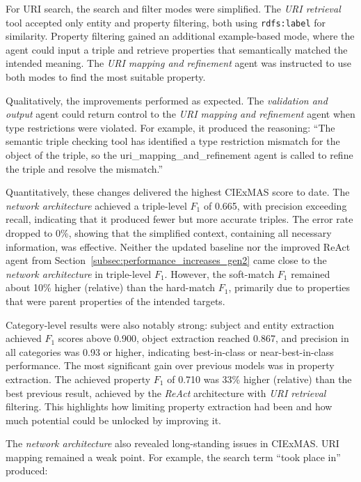 \documentclass[a4paper,oneside,bibliography=totoc]{scrbook}
\begin{document}
For URI search, the search and filter modes were simplified. The \textit{URI retrieval} tool accepted only entity and property filtering, both using \texttt{rdfs:label} for similarity. Property filtering gained an additional example-based mode, where the agent could input a triple and retrieve properties that semantically matched the intended meaning. The \textit{URI mapping and refinement} agent was instructed to use both modes to find the most suitable property.

Qualitatively, the improvements performed as expected. The \textit{validation and output} agent could return control to the \textit{URI mapping and refinement} agent when type restrictions were violated. For example, it produced the reasoning: \enquote{The semantic triple checking tool has identified a type restriction mismatch for the object of the triple, so the uri\_mapping\_and\_refinement agent is called to refine the triple and resolve the mismatch.}

Quantitatively, these changes delivered the highest CIExMAS score to date. The \textit{network architecture} achieved a triple-level $F_{1}$ of 0.665, with precision exceeding recall, indicating that it produced fewer but more accurate triples. The error rate dropped to 0\%, showing that the simplified context, containing all necessary information, was effective. Neither the updated baseline nor the improved ReAct agent from Section~\ref{subsec:performance_increases_gen2} came close to the \textit{network architecture} in triple-level $F_{1}$. However, the soft-match $F_{1}$ remained about 10\% higher (relative) than the hard-match $F_{1}$, primarily due to properties that were parent properties of the intended targets.

Category-level results were also notably strong: subject and entity extraction achieved $F_{1}$ scores above 0.900, object extraction reached 0.867, and precision in all categories was 0.93 or higher, indicating best-in-class or near-best-in-class performance. The most significant gain over previous models was in property extraction. The achieved property $F_{1}$ of 0.710 was 33\% higher (relative) than the best previous result, achieved by the \textit{ReAct} architecture with \textit{URI retrieval} filtering. This highlights how limiting property extraction had been and how much potential could be unlocked by improving it.

The \textit{network architecture} also revealed long-standing issues in CIExMAS. URI mapping remained a weak point. For example, the search term \enquote{took place in} produced:
\end{document}
